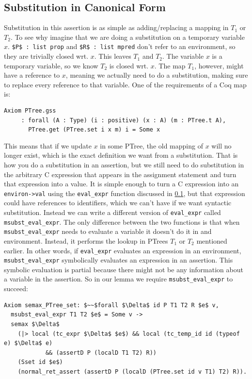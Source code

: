 \documentclass{puthesis}
\begin{document}
\subsection{Substitution in Canonical Form}

Substitution in this assertion is as simple as adding/replacing a
mapping in $T_1$ or $T_2$. To see why imagine that we are doing a
substitution on a temporary variable $x$.  \lstinline|$P$ : list prop|
and \lstinline|$R$ : list mpred| don't refer to an environment, so
they are trivially closed wrt.  $x$. This leaves $T_1$ and $T_2$. The
variable $x$ is a temporary variable, so we know $T_2$ is closed
wrt. $x$.  The map $T_1$, however, might have a reference to $x$,
meaning we actually need to do a substitution, making sure to replace
every reference to that variable. One of the requirements of a Coq map
is:

\begin{lstlisting}
Axiom PTree.gss
     : forall (A : Type) (i : positive) (x : A) (m : PTree.t A),
       PTree.get (PTree.set i x m) i = Some x
\end{lstlisting}

This means that if we update $x$ in some PTree, the old mapping of $x$
will no longer exist, which is the exact definition we want from a
substitution. That is how you do a substitution in an assertion, but
we still need to do substitution in the arbitrary C expression that
appears in the assignment statement and turn that expression into a
value. It is simple enough to turn a C expression into an
\lstinline|environ->val| using the \lstinline|eval_expr| function
discussed in \ref{}, but that expression could have references to
identifiers, which we can't have if we want syntactic
substitution. Instead we can write a different version of
\lstinline|eval_expr| called \lstinline|msubst_eval_expr|. The only
difference between the two functions is that when
\lstinline|msubst_eval_expr| needs to evaluate a variable it doesn't
do it in and environment. Instead, it performs the lookup in PTrees
$T_1$ or $T_2$ mentioned earlier. In other words, if
\lstinline|eval_expr| evaluates an expression in an environment,
\lstinline|msubst_eval_expr| symbolically evaluates an expression in
an assertion. This symbolic evaluation is partial because there might
not be any information about a variable in the assertion. So in our
lemma we require \lstinline|msubst_eval_expr| to succeed:

\begin{lstlisting}
Axiom semax_PTree_set: $~~$forall $\Delta$ id P T1 T2 R $e$ v,
  msubst_eval_expr T1 T2 $e$ = Some v ->
  semax $\Delta$
    (|> local (tc_expr $\Delta$ $e$) && local (tc_temp_id id (typeof e) $\Delta$ e) 
            && (assertD P (localD T1 T2) R))
    (Sset id $e$)
    (normal_ret_assert (assertD P (localD (PTree.set id v T1) T2) R)).
\end{lstlisting}
\end{document}
